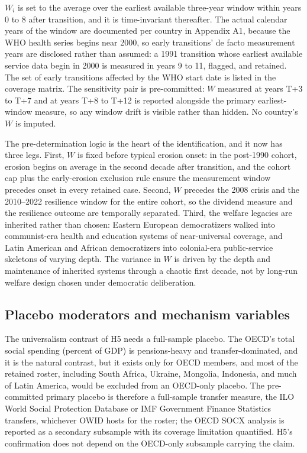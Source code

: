 \documentclass[11pt,letterpaper]{article}
\begin{document}
$W_i$ is set to the average over the earliest available three-year window within years 0 to 8 after transition, and it is time-invariant thereafter. The actual calendar years of the window are documented per country in Appendix A1, because the WHO health series begins near 2000, so early transitions' de facto measurement years are disclosed rather than assumed: a 1991 transition whose earliest available service data begin in 2000 is measured in years 9 to 11, flagged, and retained. The set of early transitions affected by the WHO start date is listed in the coverage matrix. The sensitivity pair is pre-committed: $W$ measured at years T+3 to T+7 and at years T+8 to T+12 is reported alongside the primary earliest-window measure, so any window drift is visible rather than hidden. No country's $W$ is imputed.

The pre-determination logic is the heart of the identification, and it now has three legs. First, $W$ is fixed before typical erosion onset: in the post-1990 cohort, erosion begins on average in the second decade after transition, and the cohort cap plus the early-erosion exclusion rule ensure the measurement window precedes onset in every retained case. Second, $W$ precedes the 2008 crisis and the 2010--2022 resilience window for the entire cohort, so the dividend measure and the resilience outcome are temporally separated. Third, the welfare legacies are inherited rather than chosen: Eastern European democratizers walked into communist-era health and education systems of near-universal coverage, and Latin American and African democratizers into colonial-era public-service skeletons of varying depth. The variance in $W$ is driven by the depth and maintenance of inherited systems through a chaotic first decade, not by long-run welfare design chosen under democratic deliberation.

\subsection{Placebo moderators and mechanism variables}

The universalism contrast of H5 needs a full-sample placebo. The OECD's total social spending (percent of GDP) is pensions-heavy and transfer-dominated, and it is the natural contrast, but it exists only for OECD members, and most of the retained roster, including South Africa, Ukraine, Mongolia, Indonesia, and much of Latin America, would be excluded from an OECD-only placebo. The pre-committed primary placebo is therefore a full-sample transfer measure, the ILO World Social Protection Database or IMF Government Finance Statistics transfers, whichever OWID hosts for the roster; the OECD SOCX analysis is reported as a secondary subsample with its coverage limitation quantified. H5's confirmation does not depend on the OECD-only subsample carrying the claim.
\end{document}
